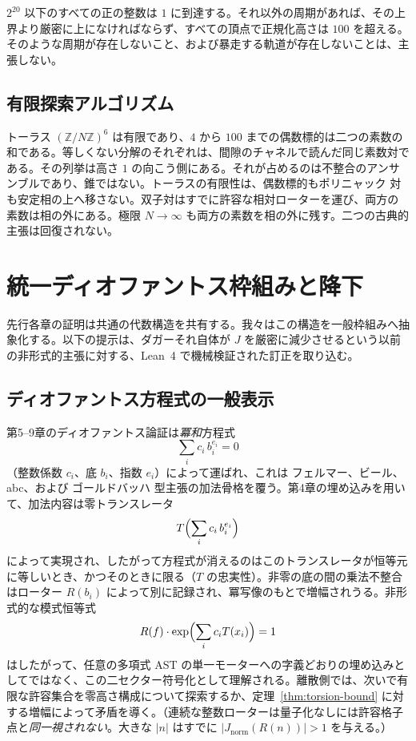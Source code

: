 \documentclass[a4paper]{article}
\theoremstyle{definition}
\theoremstyle{remark}
\newcommand{\Jnorm}{J_{\mathrm{norm}}}
\begin{document}
\(2^{20}\) 以下のすべての正の整数は \(1\) に到達する。それ以外の周期があれば、その上界より厳密に上になければならず、すべての頂点で正規化高さは \(100\) を超える。そのような周期が存在しないこと、および暴走する軌道が存在しないことは、主張しない。

\subsection{有限探索アルゴリズム}

トーラス \( (\mathbb{Z}/N\mathbb{Z})^6 \) は有限であり、\(4\) から \(100\) までの偶数標的は二つの素数の和である。等しくない分解のそれぞれは、間隙のチャネルで読んだ同じ素数対である。その列挙は高さ \(1\) の向こう側にある。それが占めるのは不整合のアンサンブルであり、錐ではない。トーラスの有限性は、偶数標的もポリニャック 対も安定相の上へ移さない。双子対はすでに許容な相対ローターを運び、両方の素数は相の外にある。極限 \(N\to\infty\) も両方の素数を相の外に残す。二つの古典的主張は回復されない。

\section{統一ディオファントス枠組みと降下}

先行各章の証明は共通の代数構造を共有する。我々はこの構造を一般枠組みへ抽象化する。以下の提示は、ダガーそれ自体が \(J\) を厳密に減少させるという以前の非形式的主張に対する、Lean~4 で機械検証された訂正を取り込む。

\subsection{ディオファントス方程式の一般表示}

第5--9章のディオファントス論証は\emph{冪和}方程式
\[
\sum_i c_i\, b_i^{e_i}=0
\]
（整数係数 \(c_i\)、底 \(b_i\)、指数 \(e_i\)）によって運ばれ、これは フェルマー、ビール、abc、および ゴールドバッハ 型主張の加法骨格を覆う。第4章の埋め込みを用いて、加法内容は零トランスレータ
\[
T\Bigl(\sum_i c_i\, b_i^{e_i}\Bigr)
\]
によって実現され、したがって方程式が消えるのはこのトランスレータが恒等元に等しいとき、かつそのときに限る（\(T\) の忠実性）。非零の底の間の乗法不整合はローター \(R(b_i)\) によって別に記録され、冪写像のもとで増幅されうる。非形式的な模式恒等式
\[
R(f) \cdot \exp\Bigl( \sum_i c_i T(x_i) \Bigr) = 1
\]
はしたがって、任意の多項式 AST の単一モーターへの字義どおりの埋め込みとしてではなく、この二セクター符号化として理解される。離散側では、次いで有限な許容集合を零高さ構成について探索するか、定理~\ref{thm:torsion-bound} に対する増幅によって矛盾を導く。（連続な整数ローターは量子化なしには許容格子点と\emph{同一視されない}。大きな \(|n|\) はすでに \(|\Jnorm(R(n))|>1\) を与える。）
\end{document}
